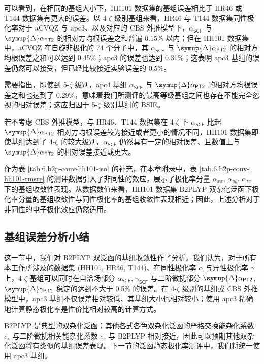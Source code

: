 可以看到，在相同的基组大小下，HH101 数据集的基组误差相比于 HR46 或 T144 数据集有更大的误差。以 4-$\zeta$ 级别基组来看，HR46 与 T144 数据集同性极化率对于 aCVQZ 与 apc3、以及对应的 CBS 外推模型下，$\alpha_\textsf{SCF}$ 与 $\symup{\Delta} \alpha_\textsf{PT2}$ 的相对方均根误差之和普遍 0.15\% 以内；但在 HH101 数据集中，aCVQZ 在自旋非极化的 74 个分子中，其 $\alpha_\textsf{SCF}$ 与 $\symup{\Delta} \alpha_\textsf{PT2}$ 的相对方均根误差之和可以达到 0.45\%；apc3 的误差也达到 0.31\%；这表明 apc3 基组的误差仍然可以接受，但已经比较接近实验误差的 0.5\%。

需要指出，即使到 5-$\zeta$ 级别，apc4 基组 $\alpha_\textsf{SCF}$ 与 $\symup{\Delta} \alpha_\textsf{PT2}$ 的相对方均根误差之和也达到了 0.29\%，意味着我们所测评的最高等级基组之间也存在不能完全忽视的相对误差；这应归因于 5-$\zeta$ 级别基组的 BSIE。

若不考虑 CBS 外推模型，与 HR46、T144 数据集在 4-$\zeta$ 下 $\alpha_\textsf{SCF}$ 比起 $\symup{\Delta} \alpha_\textsf{PT2}$ 相对方均根误差较为接近或者更小的情况不同，HH101 数据集即使基组达到了 4-$\zeta$ 的较大级别，$\alpha_\textsf{SCF}$ 仍然具有一定的相对误差、且数值上与 $\symup{\Delta} \alpha_\textsf{PT2}$ 的相对误差接近或更大。

作为表 \ref{tab.6.b2p-conv-hh101-iso} 的补充，在本章附录中，表 \ref{tab.6.b2p-conv-hh101-rmsre} 的测评数据引入了非同性的效应，展示了极化率分量 $\alpha_{xx}$, $\alpha_{yy}$, $\alpha_{zz}$ 下的基组收敛性表现。从数据数值来看，HH101 数据集 B2PLYP 双杂化泛函下极化率分量的基组收敛性与同性极化率的基组收敛性表现相近；因此，上述分析对于非同性的电子极化效应仍然适用。

\subsection{基组误差分析小结}

这一节中，我们对 B2PLYP 双泛函的基组收敛性作了分析。我们认为，对于所有本工作所涉及的数据集 (HH101, HR46, T144)、在同性极化率 $\alpha$ 与异性极化率 $\gamma$ 上，4-$\zeta$ 基组可以同时在自洽场部分 $\alpha_\textsf{SCF}$, $\gamma_\textsf{SCF}$ 与二阶微扰部分 $\symup{\Delta} \alpha_\textsf{PT2}$, $\symup{\Delta} \gamma_\textsf{PT2}$ 稳定的达到不大于 0.5\% 的误差。在 4-$\zeta$ 级别的基组或 CBS 外推模型中，apc3 基组不仅误差相对较低、其基组大小也相对较小；使用 apc3 精确地计算静态极化率是性价比相对较高的计算方式。

B2PLYP 是典型的双杂化泛函；其他各式各色双杂化泛函的严格交换能杂化系数 $c_\mathrm{x}$ 与二阶微扰相关能杂化系数 $c_\mathrm{c}$ 与 B2PLYP 相对接近，因此可以预期其他双杂化泛函将有类似的基组误差表现。下一节的泛函静态极化率测评中，我们将统一使用 apc3 基组。

